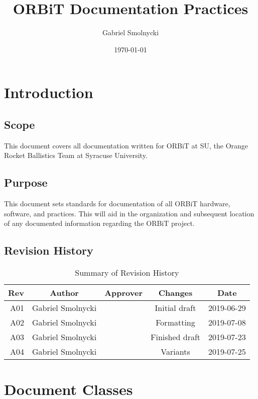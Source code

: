 \documentclass[12pt,article]{memoir}
\title{ORBiT Documentation Practices}
\author{Gabriel Smolnycki}
\date{\today}
\begin{document}


\tableofcontents*
\clearpage


\chapter{Introduction}
\section{Scope}
This document covers all documentation written for ORBiT at SU, the Orange Rocket Ballistics Team at Syracuse University.

\section{Purpose}
This document sets standards for documentation of all ORBiT hardware, software, and practices. This will aid in the organization and subsequent location of any documented information regarding the ORBiT project.

\section{Revision History}
\begin{table}[H]
	\centering
	\begin{tabu}{r || c | c | c | c }
		Rev & Author & Approver & Changes & Date\\ \hline
		A01 & Gabriel Smolnycki & & Initial draft & 2019-06-29 \\
		A02 & Gabriel Smolnycki & & Formatting & 2019-07-08 \\
		A03 & Gabriel Smolnycki & & Finished draft & 2019-07-23 \\
		A04 & Gabriel Smolnycki & & Variants & 2019-07-25
	\end{tabu}
	\caption{Summary of Revision History}
	\label{tab:rev}
\end{table}

\newpage

\chapter{Document Classes}
\end{document}
